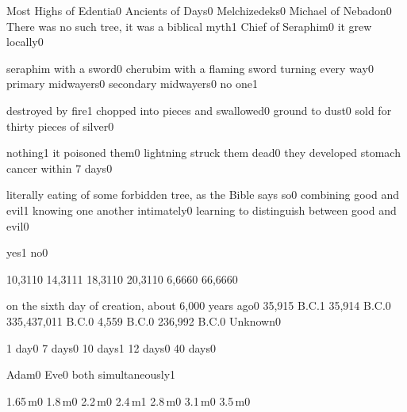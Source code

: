 {Most Highs of Edentia}{0}
{Ancients of Days}{0}
{Melchizedeks}{0}
{Michael of Nebadon}{0}
{There was no such tree, it was a biblical myth}{1}
{Chief of Seraphim}{0}
{it grew locally}{0}
\qstop


{seraphim with a sword}{0}
{cherubim with a flaming sword turning every way}{0}
{primary midwayers}{0}
{secondary midwayers}{0}
{no one}{1}
\qstop

{destroyed by fire}{1}
{chopped into pieces and swallowed}{0}
{ground to dust}{0}
{sold for thirty pieces of silver}{0}
\qstop

{nothing}{1}
{it poisoned them}{0}
{lightning struck them dead}{0}
{they developed stomach cancer within 7 days}{0}
\qstop

{literally eating of some forbidden tree, as the Bible says so}{0}
{combining good and evil}{1}
{knowing one another intimately}{0}
{learning to distinguish between good and evil}{0}
\qstop


{yes}{1}
{no}{0}
\qstop

{10,311}{0}
{14,311}{1}
{18,311}{0}
{20,311}{0}
{6,666}{0}
{66,666}{0}
\qstop

{on the sixth day of creation, about 6,000 years ago}{0}
{35,915 B.C.}{1}
{35,914 B.C.}{0}
{335,437,011 B.C.}{0}
{4,559 B.C.}{0}
{236,992 B.C.}{0}
{Unknown}{0}
\qstop

{1 day}{0}
{7 days}{0}
{10 days}{1}
{12 days}{0}
{40 days}{0}
\qstop

{Adam}{0}
{Eve}{0}
{both simultaneously}{1}
\qstop

{1.65\,m}{0}
{1.8\,m}{0}
{2.2\,m}{0}
{2.4\,m}{1}
{2.8\,m}{0}
{3.1\,m}{0}
{3.5\,m}{0}
\qstop


